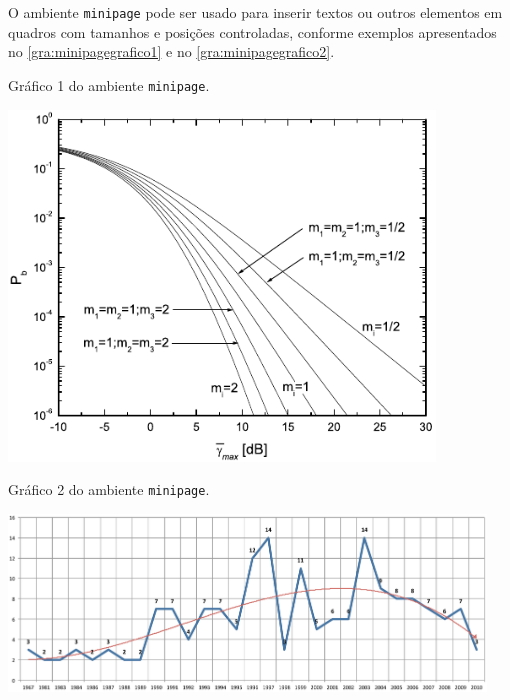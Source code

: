 O ambiente \texttt{minipage} pode ser usado para inserir textos ou outros elementos em quadros com tamanhos e posições controladas, conforme exemplos apresentados no \autoref{gra:minipagegrafico1} e no \autoref{gra:minipagegrafico2}.

\begin{graph}[htb]%
\begin{minipage}[t]{0.395\textwidth}%
\centering%
\captionsetup{width=0.85\textwidth}%
\caption{Gráfico 1 do ambiente \texttt{minipage}.}%
\label{gra:minipagegrafico1}%
\includegraphics[width=0.85\textwidth]{./CapituloExemplo/grafico1}%
\end{minipage}
\hfill
\begin{minipage}[t]{0.595\textwidth}%
\centering%
\captionsetup{width=0.95\textwidth}%
\caption{Gráfico 2 do ambiente \texttt{minipage}.}%
\label{gra:minipagegrafico2}%
\includegraphics[width=0.95\textwidth]{./CapituloExemplo/grafico2}%
\end{minipage}
\label{gra:minipagegraficos}
\end{graph}

